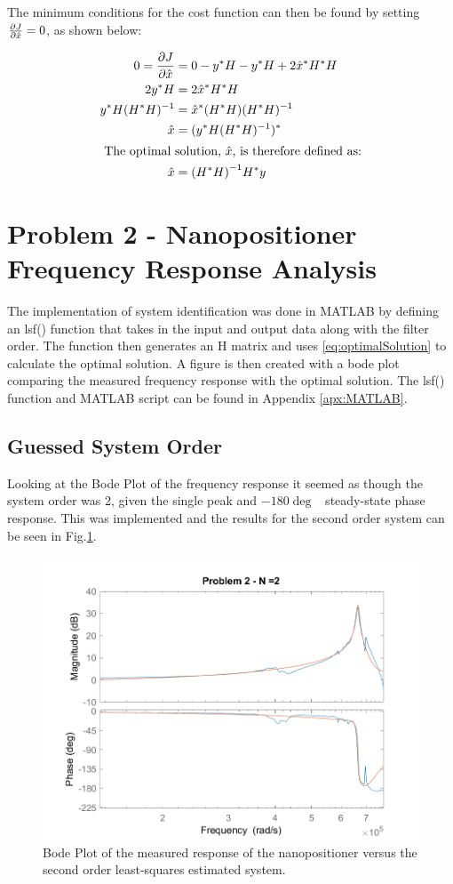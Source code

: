 \documentclass[]{article}
\renewcommand{\figurename}{Fig.}
\begin{document}
	The minimum conditions for the cost function can then be found by setting $\pdv{J}{\hat{x}} = 0$, as shown below:
	
	\begin{align}
		0 = \pdv{J}{\hat{x}} 	&= 0 -y^*H - y^* H + 2 \hat{x}^* H^* H\\
					2 y^* H		&= 2 \hat{x}^* H^* H \nonumber\\
			y^* H (H^* H)^{-1}	&= \hat{x}^* (H^* H) (H^* H)^{-1} \nonumber\\
					\hat{x}		&= (y^* H (H^* H)^{-1})^*\nonumber \\
		\intertext{	The optimal solution, $\hat{x}$, is therefore defined as:}
						\hat{x}	&= \qty(H^* H)^{-1} H^* y \label{eq:optimalSolution}
	\end{align}
	

\newpage
\section{Problem 2 - Nanopositioner Frequency Response Analysis}
	The implementation of system identification was done in MATLAB by defining an lsf() function that takes in the input and output data along with the filter order. The function then generates an H matrix and uses \eqref{eq:optimalSolution} to calculate the optimal solution. A figure is then created with a bode plot comparing the measured frequency response with the optimal solution. The lsf() function and MATLAB script can be found in Appendix \ref{apx:MATLAB}.
	
	\subsection{Guessed System Order}
		Looking at the Bode Plot of the frequency response it seemed as though the system order was 2, given the single peak and $-180 \deg$ \ steady-state phase response. This was implemented and the results for the second order system can be seen in \figurename \ref{fig:pblm2_n=2}.
	
		\begin{figure}[h]
			\centering
			\includegraphics[width=0.7\linewidth]{fig/MECH6325_CA1_pblm2_n=2}
			\caption{Bode Plot of the measured response of the nanopositioner versus the second order least-squares estimated system.}
			\label{fig:pblm2_n=2}
		\end{figure}
		
\end{document}
